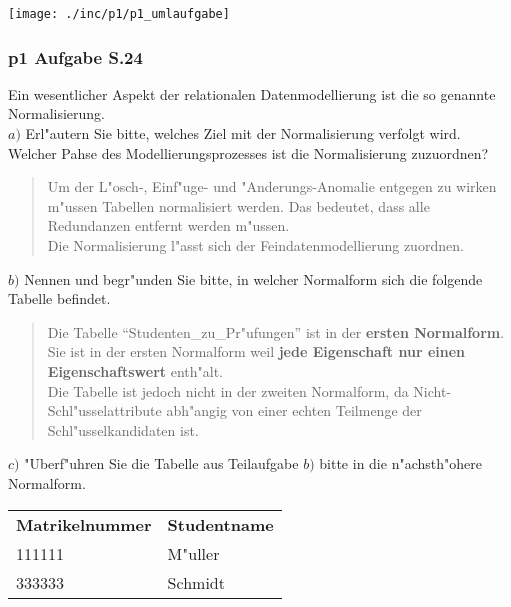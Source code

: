 \bigskip

\noindent
\texttt{[image: ./inc/p1/p1\_umlaufgabe]}

\subsubsection{p1 Aufgabe S.24}
Ein wesentlicher Aspekt der relationalen Datenmodellierung ist die so genannte Normalisierung.\\
\noindent
$a)$ Erl"autern Sie bitte, welches Ziel mit der Normalisierung verfolgt wird.
Welcher Pahse des Modellierungsprozesses ist die Normalisierung zuzuordnen?\\

\begin{quote}
Um der L"osch-, Einf"uge- und "Anderungs-Anomalie entgegen zu wirken m"ussen Tabellen normalisiert werden.
Das bedeutet, dass alle Redundanzen entfernt werden m"ussen.\\
Die Normalisierung l"asst sich der Feindatenmodellierung zuordnen.
\end{quote}

\noindent
$b)$ Nennen und begr"unden Sie bitte, in welcher Normalform sich die folgende Tabelle befindet.\\

\begin{quote}
Die Tabelle "`Studenten\_zu\_Pr"ufungen"' ist in der \textbf{ersten Normalform}.
Sie ist in der ersten Normalform weil \textbf{jede Eigenschaft nur einen Eigenschaftswert} enth"alt.\\
Die Tabelle ist jedoch nicht in der zweiten Normalform, da Nicht-Schl"usselattribute abh"angig von einer echten Teilmenge der Schl"usselkandidaten ist.
\end{quote}

\noindent
$c)$ "Uberf"uhren Sie die Tabelle aus Teilaufgabe $b)$ bitte in die n"achsth"ohere Normalform.\\


\begin{tabular}{ l l }
    \hline
    \rowcolor{LightSlateGrey}
    \textbf{Matrikelnummer} & \textbf{Studentname} \\
    111111                  & M"uller\\
    333333                  & Schmidt\\
\end{tabular}

\vspace{1cm}

